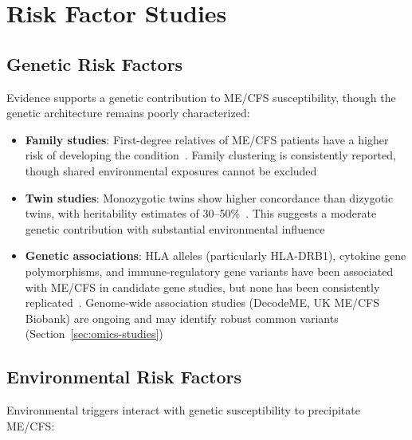 \section{Risk Factor Studies}
\label{sec:risk-factors-studies}

\subsection{Genetic Risk Factors}

Evidence supports a genetic contribution to ME/CFS susceptibility, though the genetic architecture remains poorly characterized:

\begin{itemize}
    \item \textbf{Family studies}: First-degree relatives of ME/CFS patients have a higher risk of developing the condition~\cite{Dibble2020genetics}. Family clustering is consistently reported, though shared environmental exposures cannot be excluded
    \item \textbf{Twin studies}: Monozygotic twins show higher concordance than dizygotic twins, with heritability estimates of 30--50\%~\cite{Dibble2020genetics}. This suggests a moderate genetic contribution with substantial environmental influence
    \item \textbf{Genetic associations}: HLA alleles (particularly HLA-DRB1), cytokine gene polymorphisms, and immune-regulatory gene variants have been associated with ME/CFS in candidate gene studies, but none has been consistently replicated~\cite{Dibble2020genetics}. Genome-wide association studies (DecodeME, UK ME/CFS Biobank) are ongoing and may identify robust common variants (Section~\ref{sec:omics-studies})
\end{itemize}

\subsection{Environmental Risk Factors}

Environmental triggers interact with genetic susceptibility to precipitate ME/CFS:


